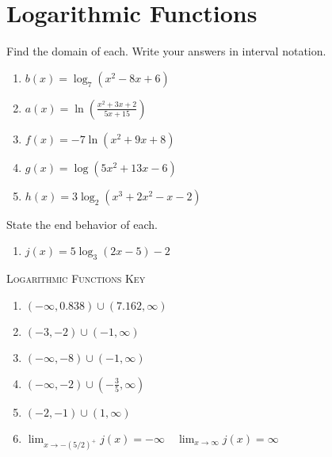 \chapter{Logarithmic Functions}

Find the domain of each. Write your answers in interval notation.
\begin{enumerate}
	\item $b(x) = \log_7\left(x^2 - 8x + 6\right)$
	\item $a(x) = \ln\left(\frac{x^2+3x+2}{5x+15}\right)$
	\item $f(x) = -7\ln\left(x^2 + 9x + 8\right)$
	\item $g(x) = \log\left(5x^2 + 13x - 6\right)$
	\item $h(x) = 3\log_2\left(x^3+2x^2-x-2\right)$
\end{enumerate}
\setcounter{Review}{\value{enumi}}

State the end behavior of each.
\begin{enumerate}	\setcounter{enumi}{\value{Review}}
	\item $j(x) = 5\log_3\left(2x-5\right) - 2$
\end{enumerate}

\newpage

\textsc{Logarithmic Functions Key}

\begin{enumerate}
	\item $(-\infty, 0.838) \cup (7.162, \infty)$
    \item $(-3, -2) \cup (-1, \infty)$
    \item $(-\infty, -8) \cup (-1, \infty)$
    \item $(-\infty, -2) \cup \left(-\frac{3}{5}, \infty\right)$
    \item $(-2, -1) \cup (1, \infty)$
    \item $\lim_{x \to -(5/2)^+} j(x) = -\infty \quad \lim_{x \to \infty} j(x) = \infty$ 
\end{enumerate}